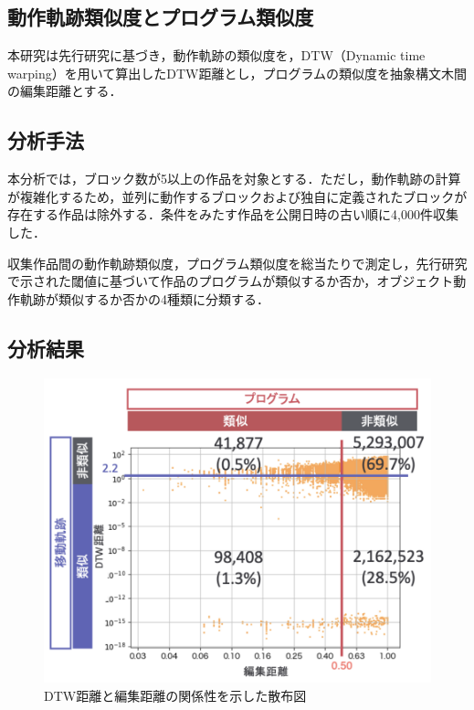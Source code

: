 \documentclass[T,J]{fose} %
\begin{document}
\subsection{動作軌跡類似度とプログラム類似度}\label{sec:Similarity}

本研究は先行研究\cite{Fukuchi2021}\cite{Mikura2022}に基づき，動作軌跡の類似度を，DTW（Dynamic time warping）を用いて算出したDTW距離とし，プログラムの類似度を抽象構文木間の編集距離とする．

\vspace{-10pt}
\subsection{分析手法}
本分析では，ブロック数が5以上の作品を対象とする．ただし，動作軌跡の計算が複雑化するため，並列に動作するブロックおよび独自に定義されたブロックが存在する作品は除外する．条件をみたす作品を公開日時の古い順に4,000件収集した．

収集作品間の動作軌跡類似度，プログラム類似度を総当たりで測定し，先行研究で示された閾値に基づいて作品のプログラムが類似するか否か，オブジェクト動作軌跡が類似するか否かの4種類に分類する．

\vspace{-10pt}
\subsection{分析結果}\label{subsec:result}

\begin{figure}[t]
	\centering
	\includegraphics[width=1.0\linewidth]{Okamoto_fig/result.pdf}
	\caption{DTW距離と編集距離の関係性を示した散布図}
	\label{fig:out-nolimit}
\end{figure}
\end{document}
